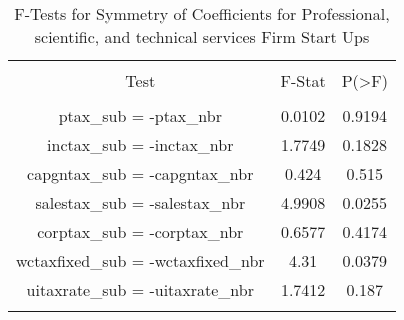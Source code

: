 
\begin{table}[!htbp] \centering 
  \caption{F-Tests for Symmetry of Coefficients for Professional, scientific, and technical services Firm Start Ups} 
  \label{54Ftests} 
\begin{tabular}{@{\extracolsep{5pt}} ccc} 
\\[-1.8ex]\hline 
\hline \\[-1.8ex] 
Test & F-Stat & P(\textgreater F) \\ 
\hline \\[-1.8ex] 
ptax\_sub = -ptax\_nbr & 0.0102 & 0.9194 \\ 
inctax\_sub = -inctax\_nbr & 1.7749 & 0.1828 \\ 
capgntax\_sub = -capgntax\_nbr & 0.424 & 0.515 \\ 
salestax\_sub = -salestax\_nbr & 4.9908 & 0.0255 \\ 
corptax\_sub = -corptax\_nbr & 0.6577 & 0.4174 \\ 
wctaxfixed\_sub = -wctaxfixed\_nbr & 4.31 & 0.0379 \\ 
uitaxrate\_sub = -uitaxrate\_nbr & 1.7412 & 0.187 \\ 
\hline \\[-1.8ex] 
\end{tabular} 
\end{table} 
